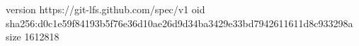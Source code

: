 version https://git-lfs.github.com/spec/v1
oid sha256:d0c1e59f84193b5f76e36d10ae26d9d34ba3429e33bd7942611611d8c933298a
size 1612818
